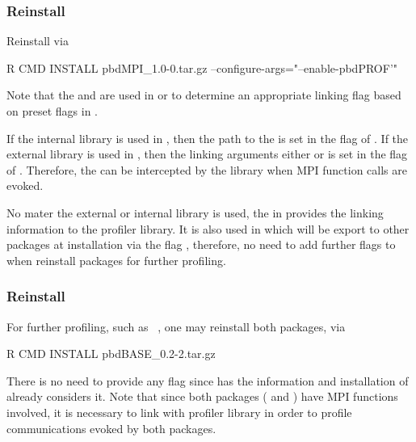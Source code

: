 \subsubsection{Reinstall }
\label{sec:pbdMPI}

Reinstall  via
\begin{Command}
R CMD INSTALL pbdMPI_1.0-0.tar.gz --configure-args="--enable-pbdPROF'"
\end{Command}
Note that the  and  are
used in  or  to determine an
appropriate linking flag  based on preset flags in
.

If the internal library is used in ,
then the path to the  is set in the flag
 of .
If the external library is used in ,
then the linking arguments either  or
 is set
in the flag  of .
Therefore, the  can be intercepted by the  library
when MPI function calls are evoked.

No mater the external or internal library is used, the 
in  provides the linking information to the
profiler library. It is also used in  which will be
export to other  packages at installation via the flag
, therefore, no need to add further flags to
 when reinstall packages for further profiling.

\subsubsection{Reinstall }
\label{sec:pbdBASE}

For further profiling, such as ~\citep{Schmidt2012pbdBASEpackage}, one may
reinstall both packages, via
\begin{Command}
R CMD INSTALL pbdBASE_0.2-2.tar.gz
\end{Command}
There is no need to provide any flag since  has the
information and installation of  already considers it.
Note that since both packages ( and )
have MPI  functions involved, it
is necessary to link with profiler library in order to profile communications
evoked by both packages.


